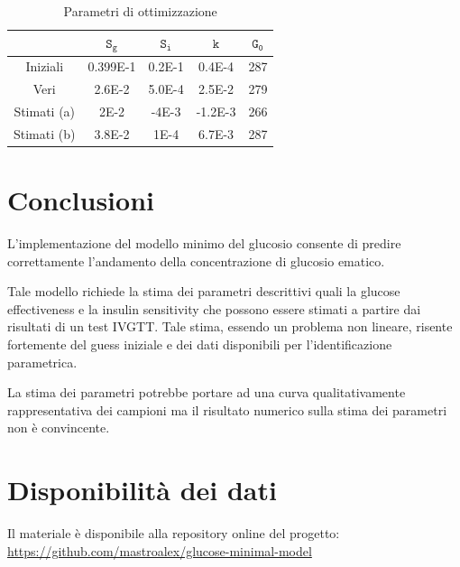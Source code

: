 \begin{table}[t!]
	\small{\begin{tabular}{|c|c|c|c|c|}
		\hline
		&  $\mathtt{S_g}$ & $\mathtt{S_i}$ &$\mathtt{k}$  &$\mathtt{G_0}$ \\
		\hline
		Iniziali & 0.399E-1 & 0.2E-1 & 0.4E-4 & 287   \\
		\hline
		Veri &2.6E-2  &5.0E-4 & 2.5E-2 &279  \\
		\hline
		Stimati (a) & 2E-2  &-4E-3  &-1.2E-3  &266  \\
		\hline
		Stimati (b) & 3.8E-2  &1E-4  &6.7E-3  &287  \\
				\hline
	\end{tabular}}
	\caption{Parametri di ottimizzazione}
	\label{tab:optim}
\end{table}



\section{Conclusioni}

L'implementazione del modello minimo del glucosio consente di predire correttamente l'andamento della concentrazione di glucosio ematico. 

Tale modello richiede la stima dei parametri descrittivi quali la glucose effectiveness e la insulin sensitivity che possono essere stimati a partire dai risultati di un test IVGTT. Tale stima, essendo un problema non lineare, risente fortemente del guess iniziale e dei dati disponibili per l'identificazione parametrica.

La stima dei parametri potrebbe portare ad una curva qualitativamente rappresentativa dei campioni ma il risultato numerico sulla stima dei parametri non è convincente.


\raggedbottom
\section*{Disponibilità dei dati}

Il materiale è disponibile alla repository online del progetto: \url{https://github.com/mastroalex/glucose-minimal-model}


\raggedbottom
\printbibliography[title=Riferimenti]


